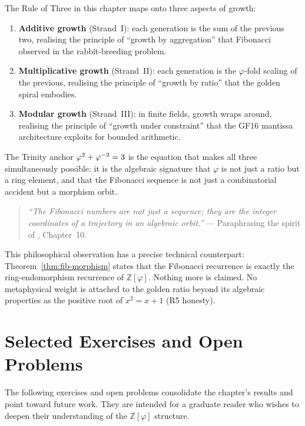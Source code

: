 The Rule of Three in this chapter maps onto three aspects of growth:

\begin{enumerate}
  \item \textbf{Additive growth} (Strand~I): each generation is the sum
        of the previous two, realising the principle of ``growth by
        aggregation'' that Fibonacci observed in the rabbit-breeding problem.
  \item \textbf{Multiplicative growth} (Strand~II): each generation is
        the \(\varphi\)-fold scaling of the previous, realising the principle
        of ``growth by ratio'' that the golden spiral embodies.
  \item \textbf{Modular growth} (Strand~III): in finite fields, growth
        wraps around, realising the principle of ``growth under constraint''
        that the GF16 mantissa architecture exploits for bounded arithmetic.
\end{enumerate}

The Trinity anchor \(\varphi^{2} + \varphi^{-2} = 3\) is the equation that
makes all three simultaneously possible: it is the algebraic signature that
\(\varphi\) is not just a ratio but a ring element, and that the Fibonacci
sequence is not just a combinatorial accident but a morphism orbit.

\begin{quotation}
\emph{``The Fibonacci numbers are not just a sequence; they are the integer
coordinates of a trajectory in an algebraic orbit.''} ---
Paraphrasing the spirit of \cite{hardy_wright}, Chapter~10.
\end{quotation}

This philosophical observation has a precise technical counterpart:
Theorem~\ref{thm:fib-morphism} states that the Fibonacci recurrence is
exactly the ring-endomorphism recurrence of \(\mathbb{Z}[\varphi]\).
Nothing more is claimed.  No metaphysical weight is attached to the
golden ratio beyond its algebraic properties as the positive root of
\(x^2 = x + 1\) (R5 honesty).

\section{Selected Exercises and Open Problems}
\label{sec:ch7-exercises}

The following exercises and open problems consolidate the chapter's results
and point toward future work.  They are intended for a graduate reader who
wishes to deepen their understanding of the \(\mathbb{Z}[\varphi]\) structure.

